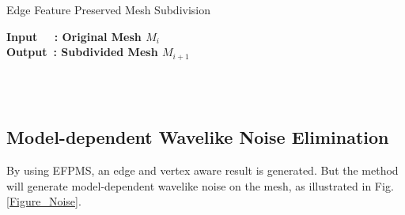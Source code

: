 \documentclass[10pt, conference, compsocconf]{IEEEtran}
\begin{document}
\begin{algorithm}
    \caption{Edge Feature Preserved Mesh Subdivision}
    \label{Algorithm_EFPMS}
    \hspace*{\algorithmicindent} \textbf{Input~~ : Original Mesh $M_i$} \\
    \hspace*{\algorithmicindent} \textbf{Output~: Subdivided Mesh $M_{i+1}$} \\
    \begin{algorithmic}
        \ENDFOR\\
        \STATE {}
        \ENDFOR\\
        \STATE {}
    \end{algorithmic}
\end{algorithm}


\subsection{Model-dependent Wavelike Noise Elimination}
By using EFPMS, an edge and vertex aware result is generated. But the method will generate model-dependent wavelike noise on the mesh, as illustrated in Fig. \ref{Figure_Noise}.
\end{document}
